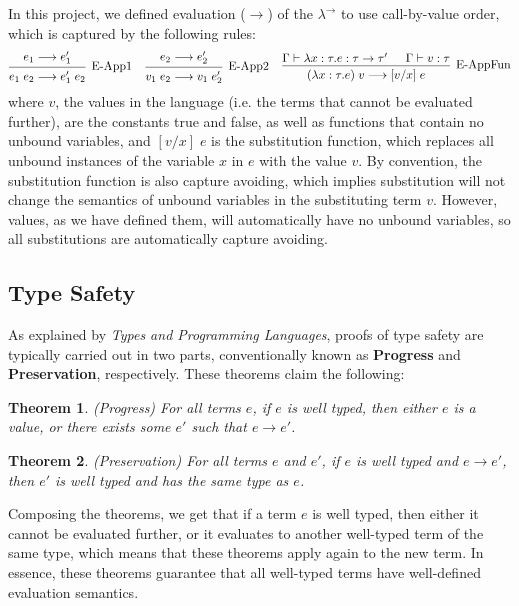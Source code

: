 \documentclass[12pt, letterpaper]{article}
\newtheorem{theorem}{Theorem}
\begin{document}
In this project, we defined evaluation ($\longrightarrow$) of the $\lambda^{\to}$ to use call-by-value order, which is captured by the following rules:
\[
\begin{prooftree}
\hypo{e_1 \longrightarrow e_1'}
\infer1[E-App1]{e_1\;e_2 \longrightarrow e_1'\;e_2}
\end{prooftree}
\;\;\;\;
\begin{prooftree}
\hypo{e_2 \longrightarrow e_2'}
\infer1[E-App2]{v_1\;e_2 \longrightarrow v_1\;e_2'}
\end{prooftree}
\;\;\;\;
\begin{prooftree}
\hypo{\Gamma \vdash \lambda x : \tau . e : \tau \to \tau'}
\hypo{\Gamma \vdash v : \tau}
\infer2[E-AppFun]{(\lambda x : \tau . e)\;v \longrightarrow [v/x]\; e}
\end{prooftree}
\]
where $v$, the values in the language (i.e. the terms that cannot be evaluated further), are the constants true and false, as well as functions that contain no unbound variables, and $[v/x]\;e$ is the substitution function, which replaces all unbound instances of the variable $x$ in $e$ with the value $v$. By convention, the substitution function is also capture avoiding, which implies substitution will not change the semantics of unbound variables in the substituting term $v$. However, values, as we have defined them, will automatically have no unbound variables, so all substitutions are automatically capture avoiding.

\subsection{Type Safety}

As explained by \textit{Types and Programming Languages}, proofs of type safety are typically carried out in two parts, conventionally known as \textbf{Progress} and \textbf{Preservation}, respectively. These theorems claim the following:
\begin{theorem}
(Progress) For all terms $e$, if $e$ is well typed, then either $e$ is a value, or there exists some $e'$ such that $e \longrightarrow e'$.
\end{theorem}
\begin{theorem}
(Preservation) For all terms $e$ and $e'$, if $e$ is well typed and $e \longrightarrow e'$, then $e'$ is well typed and has the same type as $e$.
\end{theorem}
Composing the theorems, we get that if a term $e$ is well typed, then either it cannot be evaluated further, or it evaluates to another well-typed term of the same type, which means that these theorems apply again to the new term. In essence, these theorems guarantee that all well-typed terms have well-defined evaluation semantics.
\end{document}
